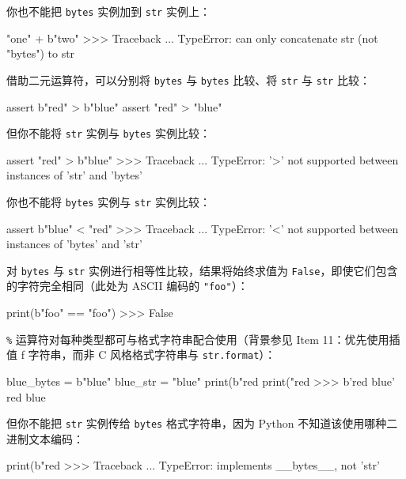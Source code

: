 你也不能把 \texttt{bytes} 实例加到 \texttt{str} 实例上：

\begin{codebox}[python]
"one" + b"two"
>>>
Traceback ...
TypeError: can only concatenate str (not "bytes") to str
\end{codebox}

借助二元运算符，可以分别将 \texttt{bytes} 与 \texttt{bytes} 比较、将 \texttt{str} 与 \texttt{str} 比较：

\begin{codebox}[python]
assert b"red" > b"blue"
assert "red" > "blue"
\end{codebox}

但你不能将 \texttt{str} 实例与 \texttt{bytes} 实例比较：

\begin{codebox}[python]
assert "red" > b"blue"
>>>
Traceback ...
TypeError: '>' not supported between instances of 'str' and
'bytes'
\end{codebox}

你也不能将 \texttt{bytes} 实例与 \texttt{str} 实例比较：

\begin{codebox}[python]
assert b"blue" < "red"
>>>
Traceback ...
TypeError: '<' not supported between instances of 'bytes' and
'str'
\end{codebox}

对 \texttt{bytes} 与 \texttt{str} 实例进行相等性比较，结果将始终求值为 \texttt{False}，即使它们包含的字符完全相同（此处为 ASCII 编码的 \texttt{"foo"}）：

\begin{codebox}[python]
print(b"foo" == "foo")
>>>
False
\end{codebox}

\texttt{\%} 运算符对每种类型都可与格式字符串配合使用（背景参见 Item 11：优先使用插值 f 字符串，而非 C 风格格式字符串与 \texttt{str.format}）：

\begin{codebox}[python]
blue_bytes = b"blue"
blue_str = "blue"
print(b"red %
print("red %
>>>
b'red blue'
red blue
\end{codebox}

但你不能把 \texttt{str} 实例传给 \texttt{bytes} 格式字符串，因为 Python 不知道该使用哪种二进制文本编码：

\begin{codebox}[python]
print(b"red %
>>>
Traceback ...
TypeError: %
implements __bytes__, not 'str'
\end{codebox}

